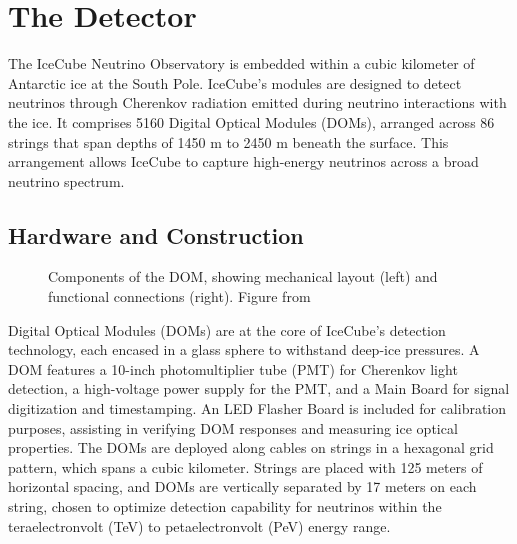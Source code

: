 \section{The Detector}

The IceCube Neutrino Observatory is embedded within a cubic kilometer of Antarctic ice at the South Pole.
IceCube's modules are designed to detect neutrinos through Cherenkov radiation emitted during neutrino interactions with the ice.
It comprises 5160 Digital Optical Modules (DOMs), arranged across 86 strings that span depths of 1450 m to 2450 m beneath the surface.
This arrangement allows IceCube to capture high-energy neutrinos across a broad neutrino spectrum.

\subsection{Hardware and Construction}

\begin{figure}
    \caption{ Components of the DOM, showing mechanical layout (left) and functional connections (right). Figure from \cite{IC3_thedetector}}
    \label{fig:DOM}
\end{figure}

Digital Optical Modules (DOMs) are at the core of IceCube’s detection technology, each encased in a glass sphere to withstand deep-ice pressures.
A DOM features a 10-inch photomultiplier tube (PMT) for Cherenkov light detection, a high-voltage power supply for the PMT, and a Main Board for signal digitization and timestamping.
An LED Flasher Board is included for calibration purposes, assisting in verifying DOM responses and measuring ice optical properties.
The DOMs are deployed along cables on strings in a hexagonal grid pattern, which spans a cubic kilometer.
Strings are placed with 125 meters of horizontal spacing, and DOMs are vertically separated by 17 meters on each string, chosen to optimize detection capability for neutrinos within the teraelectronvolt (TeV) to petaelectronvolt (PeV) energy range.

